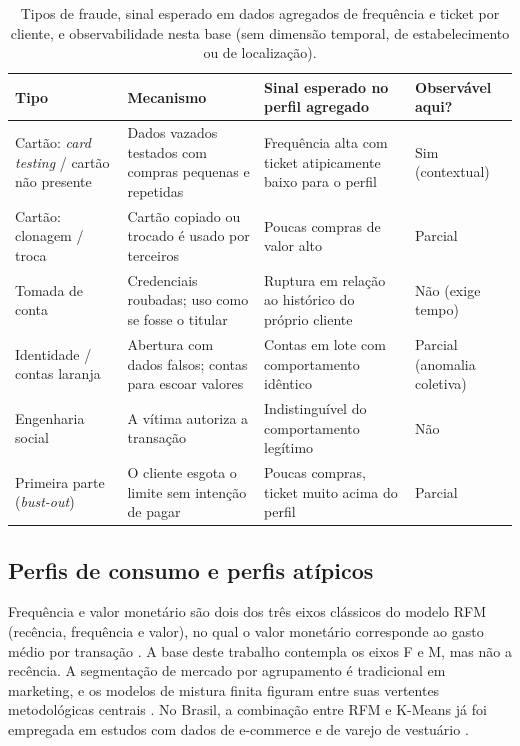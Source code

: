 \documentclass[12pt]{article}
\begin{document}
\begin{table}[t]
\centering\small
\caption{Tipos de fraude, sinal esperado em dados agregados de frequência e ticket por cliente, e
observabilidade nesta base (sem dimensão temporal, de estabelecimento ou de localização).}
\label{tab:fraudes}
\begin{tabularx}{\textwidth}{@{}P{3.1cm}L L P{2.3cm}@{}}
\toprule
\textbf{Tipo} & \textbf{Mecanismo} & \textbf{Sinal esperado no perfil agregado} & \textbf{Observável aqui?} \\
\midrule
Cartão: \emph{card testing} / cartão não presente & Dados vazados testados com compras pequenas e repetidas & Frequência alta com ticket atipicamente baixo para o perfil & Sim (contextual) \\
Cartão: clonagem / troca & Cartão copiado ou trocado é usado por terceiros & Poucas compras de valor alto & Parcial \\
Tomada de conta & Credenciais roubadas; uso como se fosse o titular & Ruptura em relação ao histórico do próprio cliente & Não (exige tempo) \\
Identidade / contas laranja & Abertura com dados falsos; contas para escoar valores & Contas em lote com comportamento idêntico & Parcial (anomalia coletiva) \\
Engenharia social & A vítima autoriza a transação & Indistinguível do comportamento legítimo & Não \\
Primeira parte (\emph{bust-out}) & O cliente esgota o limite sem intenção de pagar & Poucas compras, ticket muito acima do perfil & Parcial \\
\bottomrule
\end{tabularx}
\end{table}

\subsection{Perfis de consumo e perfis atípicos}
Frequência e valor monetário são dois dos três eixos clássicos do modelo RFM (recência, frequência e
valor), no qual o valor monetário corresponde ao gasto médio por transação \cite{fader2005rfm}. A base
deste trabalho contempla os eixos F e M, mas não a recência. A segmentação de mercado por agrupamento é
tradicional em marketing, e os modelos de mistura finita figuram entre suas vertentes metodológicas
centrais \cite{wedel2000segmentation}. No Brasil, a combinação entre RFM e K-Means já foi empregada em
estudos com dados de e-commerce \cite{kutz2025rfm} e de varejo de vestuário \cite{fernandes2022rfm}.
\end{document}
